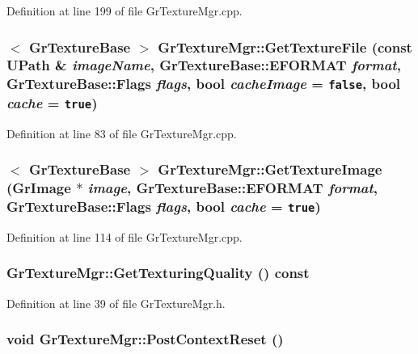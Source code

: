 Definition at line 199 of file GrTextureMgr.cpp.\hypertarget{class_gr_texture_mgr_42a8622f0332de231fcabe925bf06b21}{
\subsubsection[{GetTextureFile}]{$<$ {\bf GrTextureBase} $>$ GrTextureMgr::GetTextureFile (const {\bf UPath} \& {\em imageName}, \/  {\bf GrTextureBase::EFORMAT} {\em format}, \/  {\bf GrTextureBase::Flags} {\em flags}, \/  bool {\em cacheImage} = {\tt false}, \/  bool {\em cache} = {\tt true})}}
\label{class_gr_texture_mgr_42a8622f0332de231fcabe925bf06b21}




Definition at line 83 of file GrTextureMgr.cpp.\hypertarget{class_gr_texture_mgr_a488c8b7fc80b98be3f6242b2e7365f4}{
\subsubsection[{GetTextureImage}]{$<$ {\bf GrTextureBase} $>$ GrTextureMgr::GetTextureImage ({\bf GrImage} $\ast$ {\em image}, \/  {\bf GrTextureBase::EFORMAT} {\em format}, \/  {\bf GrTextureBase::Flags} {\em flags}, \/  bool {\em cache} = {\tt true})}}
\label{class_gr_texture_mgr_a488c8b7fc80b98be3f6242b2e7365f4}




Definition at line 114 of file GrTextureMgr.cpp.\hypertarget{class_gr_texture_mgr_b9120a416ac73224fe76245e7083db19}{
\subsubsection[{GetTexturingQuality}]{ GrTextureMgr::GetTexturingQuality () const}}
\label{class_gr_texture_mgr_b9120a416ac73224fe76245e7083db19}




Definition at line 39 of file GrTextureMgr.h.\hypertarget{class_gr_texture_mgr_d6946717cc8105c67252c3cbd6dc7c14}{
\subsubsection[{PostContextReset}]{\setlength{\rightskip}{0pt plus 5cm}void GrTextureMgr::PostContextReset ()}}
\label{class_gr_texture_mgr_d6946717cc8105c67252c3cbd6dc7c14}




